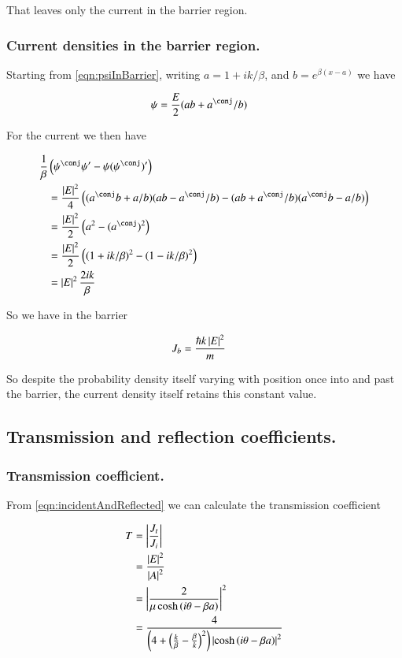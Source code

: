 \documentclass{article}
\begin{document}
That leaves only the current in the barrier region.

\subsubsection{ Current densities in the barrier region. }

Starting from \ref{eqn:psiInBarrier}, writing $a = 1 + ik/\beta$, and $b=e^{\beta(x-a)}$ we have

\begin{align*}
\psi &= \frac{E}{2} (a b + a^\conj/b)
\end{align*}

For the current we then have

\begin{align*}
\inv{\beta}&\left(\psi^\conj \psi' - \psi (\psi^\conj)' \right) \\
&=
\frac{\Abs{E}^2}{4}
\left(
(a^\conj b + a/b) (a b - a^\conj/b)
-(a b + a^\conj/b) (a^\conj b - a/b)
\right) \\
&=
\frac{\Abs{E}^2}{2} \left(a^2 - (a^\conj)^2 \right) \\
&=
\frac{\Abs{E}^2}{2} \left( 
(1 + ik/\beta)^2
-(1 - ik/\beta)^2
 \right) \\
&=
\Abs{E}^2 \frac{2ik}{\beta}
\end{align*}

So we have in the barrier

\begin{align*}
J_b 
&=
\frac{\hbar k \left\lvert{E}\right\rvert^2 }{m}
\end{align*}

So despite the probability density itself varying with position once into and past the barrier, the current density itself
retains this
constant value.

\subsection{ Transmission and reflection coefficients. }

\subsubsection{ Transmission coefficient. }

From \ref{eqn:incidentAndReflected} we can calculate the transmission
coefficient

\begin{align*}
T 
&= \left\lvert{\frac{J_t}{J_i}}\right\rvert \\
&= \frac{\left\lvert{E}\right\rvert^2}{\left\lvert{A}\right\rvert^2} \\
&= \left\lvert{\frac{2  } { \mu \cosh\left( i\theta -\beta a \right) }}\right\rvert^2 \\
&= \frac{4} { 
\left(4 + \left( \frac{k}{\beta} -\frac{\beta}{k} \right)^2 \right)
\left\lvert{\cosh\left( i\theta -\beta a \right)}\right\rvert^2 }
\end{align*}
\end{document}
